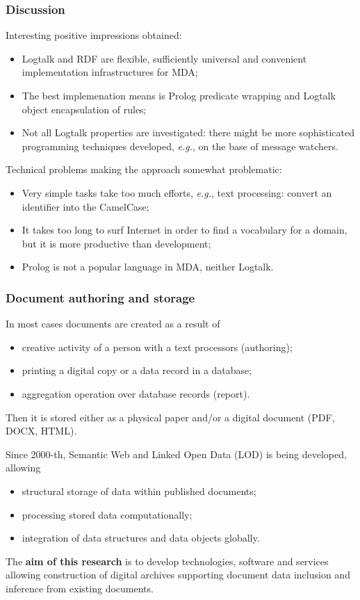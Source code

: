 \documentclass[10pt]{beamer}
\begin{document}
\begin{frame}
  \frametitle{Discussion}
  Interesting positive impressions obtained:
  \begin{itemize}
  \item Logtalk and RDF are flexible, sufficiently universal and convenient implementation infrastructures for MDA;
  \item The best implemenation means is Prolog predicate wrapping and Logtalk object encapsulation of rules;
  \item Not all Logtalk properties are investigated: there might be more sophisticated programming techniques developed, \emph{e.g.}, on the base of message watchers.
  \end{itemize}
  Technical problems making the approach somewhat problematic:
  \begin{itemize}
  \item Very simple tasks take too much efforts, \emph{e.g.}, text processing: convert an identifier into the CamelCase;
  \item It takes too long to surf Internet in order to find a vocabulary for a domain, but it is more productive than development;
  \item Prolog is not a popular language in MDA, neither Logtalk.
  \end{itemize}
\end{frame}

\begin{frame}
  \frametitle{Document authoring and storage}
  In most cases documents are created as a result of
  \begin{itemize}
  \item creative activity of a person with a text processors (authoring);
  \item printing a digital copy or a data record in a database;
  \item aggregation operation over database records (report).
  \end{itemize}
  Then it is stored either as a physical paper and/or a digital document (PDF, DOCX, HTML).

  Since 2000-th, Semantic Web and Linked Open Data (LOD) is being developed, allowing
  \begin{itemize}
  \item structural storage of data within published documents;
  \item processing stored data computationally;
  \item integration of data structures and data objects globally.
  \end{itemize}

  The \textbf{aim of this research} is to develop technologies, software and services allowing construction of digital archives supporting document data inclusion and inference from existing documents.
\end{frame}
\end{document}
